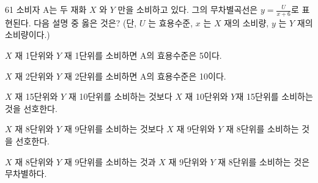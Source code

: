 \begin{question}{61}
소비자 A는 두 재화 $X$ 와 $Y$ 만을 소비하고 있다. 그의 무차별곡선은 $y= \frac{ U } { x+6 }$로 표현된다. 다음 설명 중 옳은 것은? (단, $U$ 는 효용수준, $x$ 는 $X$ 재의 소비량, $y$ 는 $Y$ 재의 소비량이다.)
\begin{choices}
  \item $X$ 재 1단위와 $Y$ 재 1단위를 소비하면 A의 효용수준은 5이다.
  \item $X$ 재 2단위와 $Y$ 재 2단위를 소비하면 A의 효용수준은 10이다.
  \item $X$ 재 15단위와 $Y$ 재 10단위를 소비하는 것보다 $X$ 재 10단위와 $Y$재 15단위를 소비하는 것을 선호한다.
  \item $X$ 재 8단위와 $Y$ 재 9단위를 소비하는 것보다 $X$ 재 9단위와 $Y$ 재 8단위를 소비하는 것을 선호한다.
  \item $X$ 재 8단위와 $Y$ 재 9단위를 소비하는 것과 $X$ 재 9단위와 $Y$ 재 8단위를 소비하는 것은 무차별하다.
\end{choices}
\end{question}
